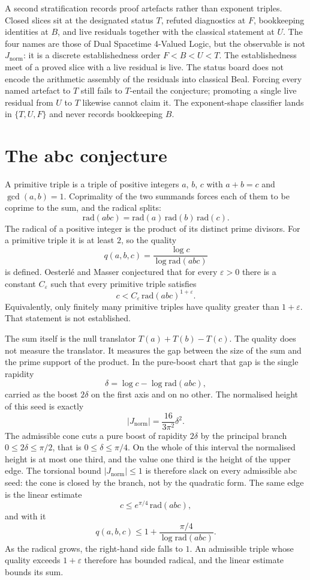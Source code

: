 \documentclass[a4paper]{article}
\theoremstyle{definition}
\theoremstyle{remark}
\newcommand{\Jnorm}{J_{\mathrm{norm}}}
\begin{document}
A second stratification records proof artefacts rather than exponent triples. Closed slices sit at the designated status \( T \), refuted diagnostics at \( F \), bookkeeping identities at \( B \), and live residuals together with the classical statement at \( U \). The four names are those of Dual Spacetime 4-Valued Logic, but the observable is not \( \Jnorm \): it is a discrete establishedness order \( F<B<U<T \). The establishedness meet of a proved slice with a live residual is live. The status board does not encode the arithmetic assembly of the residuals into classical Beal. Forcing every named artefact to \( T \) still fails to \( T \)-entail the conjecture; promoting a single live residual from \( U \) to \( T \) likewise cannot claim it. The exponent-shape classifier lands in \( \{T,U,F\} \) and never records bookkeeping \( B \).

\section{The abc conjecture}

A primitive triple is a triple of positive integers \(a\), \(b\), \(c\) with \(a+b=c\) and \(\gcd(a,b)=1\). Coprimality of the two summands forces each of them to be coprime to the sum, and the radical splits:
\[
\mathrm{rad}(abc)=\mathrm{rad}(a)\,\mathrm{rad}(b)\,\mathrm{rad}(c).
\]
The radical of a positive integer is the product of its distinct prime divisors. For a primitive triple it is at least \(2\), so the quality
\[
q(a,b,c)=\frac{\log c}{\log\mathrm{rad}(abc)}
\]
is defined. Oesterlé and Masser conjectured that for every \(\varepsilon>0\) there is a constant \(C_\varepsilon\) such that every primitive triple satisfies
\[
c<C_\varepsilon\,\mathrm{rad}(abc)^{1+\varepsilon}.
\]
Equivalently, only finitely many primitive triples have quality greater than \(1+\varepsilon\). That statement is not established.

The sum itself is the null translator \(T(a)+T(b)-T(c)\). The quality does not measure the translator. It measures the gap between the size of the sum and the prime support of the product. In the pure-boost chart that gap is the single rapidity
\[
\delta=\log c-\log\mathrm{rad}(abc),
\]
carried as the boost \(2\delta\) on the first axis and on no other. The normalised height of this seed is exactly
\[
|\Jnorm|=\frac{16}{3\pi^2}\delta^2.
\]
The admissible cone cuts a pure boost of rapidity \(2\delta\) by the principal branch \(0\le 2\delta\le\pi/2\), that is \(0\le\delta\le\pi/4\). On the whole of this interval the normalised height is at most one third, and the value one third is the height of the upper edge. The torsional bound \(|\Jnorm|\le 1\) is therefore slack on every admissible abc seed: the cone is closed by the branch, not by the quadratic form. The same edge is the linear estimate
\[
c\le e^{\pi/4}\,\mathrm{rad}(abc),
\]
and with it
\[
q(a,b,c)\le 1+\frac{\pi/4}{\log\mathrm{rad}(abc)}.
\]
As the radical grows, the right-hand side falls to \(1\). An admissible triple whose quality exceeds \(1+\varepsilon\) therefore has bounded radical, and the linear estimate bounds its sum.
\end{document}
